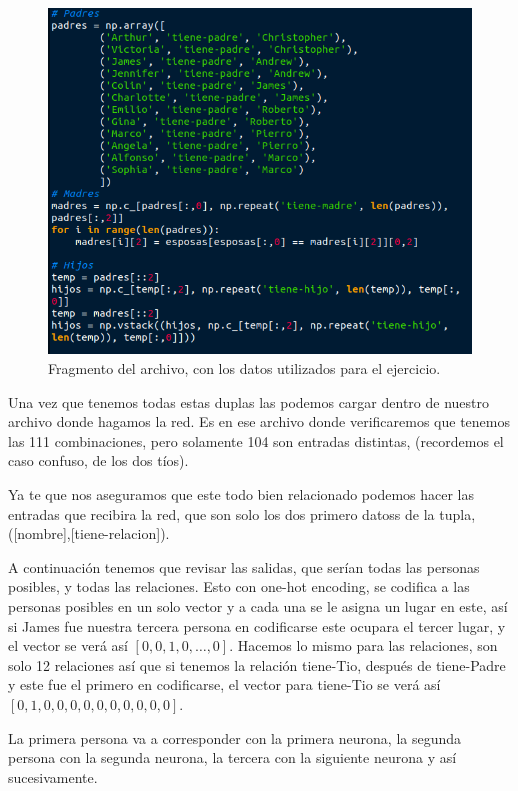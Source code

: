   \begin{figure}[h]
   \centering
   \includegraphics[scale=.5]{../Figuras/Hinton/data.png}
   \caption{Fragmento del archivo, con los datos utilizados para el ejercicio.}
  \label{fig:ejData}
  \end{figure}


Una vez que tenemos todas estas duplas las podemos cargar dentro de nuestro archivo donde hagamos la red. Es en ese archivo donde verificaremos que tenemos las 111 combinaciones, pero solamente 104 son entradas distintas, (recordemos el caso confuso, de los dos tíos). 

Ya te que nos aseguramos que este todo bien relacionado podemos hacer las entradas que recibira la red, que son solo los dos primero datoss de la tupla, ([nombre],[tiene-relacion]). 

A continuación tenemos que revisar las salidas, que serían todas las personas posibles, y todas las relaciones. Esto con one-hot encoding, se codifica a las personas posibles en un solo vector y a cada una se le asigna un lugar en este, así si James fue nuestra tercera persona en codificarse este ocupara el tercer lugar, y el vector se verá así $[0,0,1,0,\dots,0]$. Hacemos lo mismo para las relaciones, son solo 12 relaciones así que si tenemos la relación tiene-Tio, después de tiene-Padre y este fue el primero en codificarse, el vector para tiene-Tio se verá  así $[0,1,0,0,0,0,0,0,0,0,0,0]$. 

La primera persona va a corresponder con la primera neurona, la segunda persona con la segunda neurona, la tercera con la siguiente neurona y así sucesivamente. 

